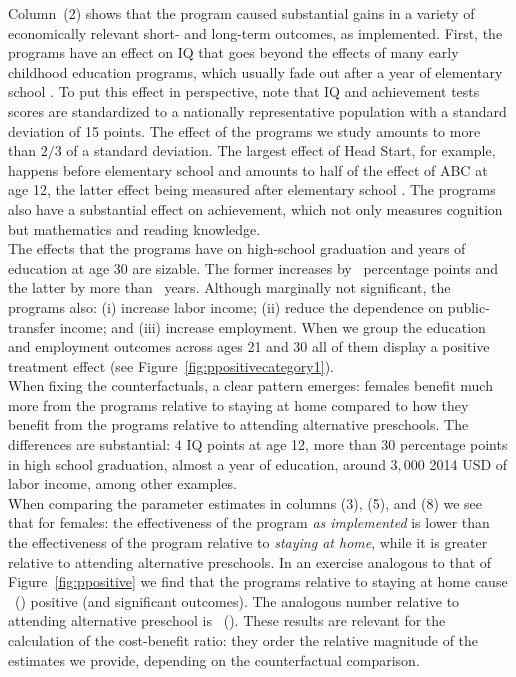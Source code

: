 \noindent Column~(2) shows that the program caused substantial gains in a variety of economically relevant short- and long-term outcomes, as implemented. First, the programs have an effect on IQ that goes beyond the effects of many early childhood education programs, which usually fade out after a year of elementary school \citep{Hojman_2015_EvidenceFadeOut,Elango_Hojman_etal_2016_Early-Edu}. To put this effect in perspective, note that IQ and achievement tests scores are standardized to a nationally representative population with a standard deviation of 15 points. The effect of the programs we study amounts to more than $2/3$ of a standard deviation. The largest effect of Head Start, for example, happens before elementary school and amounts to half of the effect of ABC at age 12, the latter effect being measured after elementary school \citep{Elango_Hojman_etal_2016_Early-Edu}. The programs also have a substantial effect on achievement, which not only measures cognition but mathematics and reading knowledge.\\

\noindent The effects that the programs have on high-school graduation and years of education at age 30 are sizable. The former increases by \hsgradf\ percentage points and the latter by more than \yearsedf\ years. Although marginally not significant, the programs also: (i) increase labor income; (ii) reduce the dependence on public-transfer income; and (iii) increase employment. When we group the education and employment outcomes across ages 21 and 30 all of them display a positive treatment effect (see Figure~\ref{fig:ppositivecategory1}).\\

\noindent When fixing the counterfactuals, a clear pattern emerges: females benefit much more from the programs relative to staying at home compared to how they benefit from the programs relative to attending alternative preschools. The differences are substantial: $4$ IQ points at age 12, more than $30$ percentage points in high school graduation, almost a year of education, around $3,000$ 2014 USD of labor income, among other examples. \\

\noindent When comparing the parameter estimates in columns (3), (5), and (8) we see that for females: the effectiveness of the program \textit{as implemented} is lower than the effectiveness of the program relative to \textit{staying at home}, while it is greater relative to attending alternative preschools. In an exercise analogous to that of Figure~\ref{fig:ppositive} we find that the programs relative to staying at home cause \positivecsnf\ (\positivescsnf) positive (and significant outcomes). The analogous number relative to attending alternative preschool is \positivecsaf\ (\positivescsaf). These results are relevant for the calculation of the cost-benefit ratio: they order the relative magnitude of the estimates we provide, depending on the counterfactual comparison.\\ 

